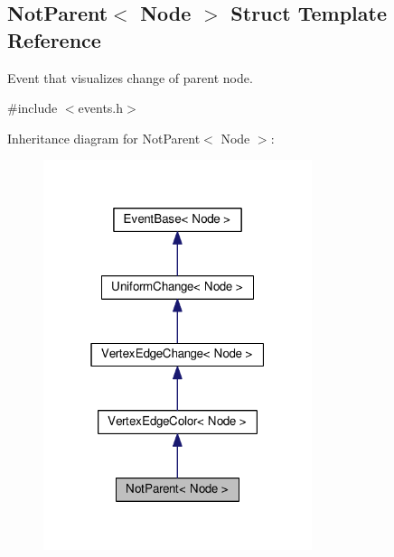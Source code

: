 \hypertarget{structNotParent}{}\subsection{Not\+Parent$<$ Node $>$ Struct Template Reference}
\label{structNotParent}


Event that visualizes change of parent node.  




{\ttfamily \#include $<$events.\+h$>$}



Inheritance diagram for Not\+Parent$<$ Node $>$\+:\nopagebreak
\begin{figure}[H]
\begin{center}
\leavevmode
\includegraphics[width=223pt]{structNotParent__inherit__graph}
\end{center}
\end{figure}


